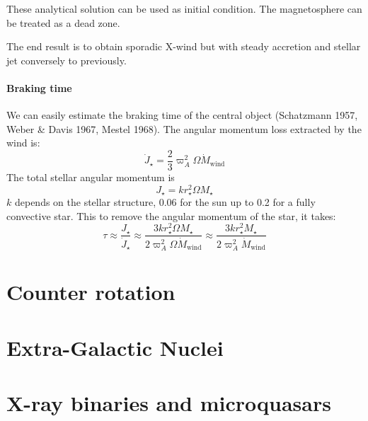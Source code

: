 \documentclass[10pt,a4paper,english,draft]{article}
\begin{document}
These analytical solution can be used as initial condition. The magnetosphere can be treated as a dead zone.


The end result is to obtain sporadic X-wind but with steady accretion and stellar jet conversely to previously.

\paragraph{Braking time}

We can easily estimate the braking time of the central object (Schatzmann 1957, Weber \& Davis 1967, Mestel 1968). The angular momentum loss extracted by the wind is:
\begin{equation}
  \dot{J}_\star = \frac{2}{3}\varpi_A^2\Omega \dot{M}_\mathrm{wind}
\end{equation}
The total stellar angular momentum is
\begin{equation}
  J_\star = kr^2_\star \Omega M_\star
\end{equation}
$k$ depends on the stellar structure, \num{0.06} for the sun up to \num{0.2} for a fully convective star. This to remove the angular momentum of the star, it takes:
\begin{equation}
  \tau \approx \frac{J_\star}{\dot{J}_\star} \approx \frac{3kr^2_\star \Omega M_\star}{2\varpi_A^2\Omega\dot{M}_\mathrm{wind}} \approx \frac{3 kr_\star^2 M_\star}{2\varpi_A^2\dot{M}_\mathrm{wind}}
\end{equation}

\section{Counter rotation}
\label{sec:counter_rotation}



\section{Extra-Galactic Nuclei}
\section{X-ray binaries and microquasars}

\appendix

\makeatletter
\def\@seccntformat#1{Appendix~\csname the#1\endcsname:\quad}
\makeatother

\newpage




\listoffixmes
\end{document}
